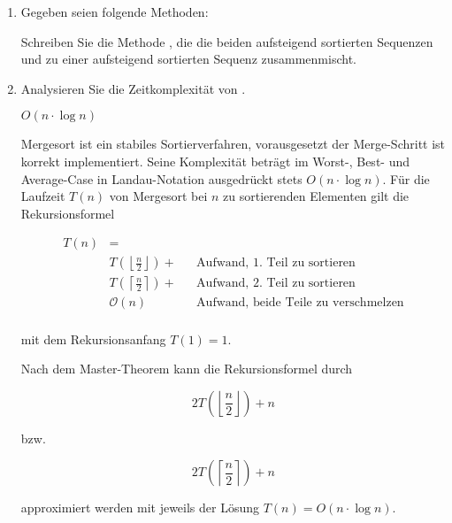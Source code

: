 \documentclass{lehramt-informatik}
\begin{document}
\begin{enumerate}


\item Gegeben seien folgende Methoden:


Schreiben Sie die Methode ,
die die beiden aufsteigend sortierten Sequenzen  und  zu
einer aufsteigend sortierten Sequenz zusammenmischt.

\begin{antwort}
\end{antwort}


\item Analysieren Sie die Zeitkomplexität von .

\begin{antwort}
$O(n \cdot \log n)$


Mergesort ist ein stabiles Sortierverfahren, vorausgesetzt der
Merge-Schritt ist korrekt implementiert. Seine Komplexität beträgt im
Worst-, Best- und Average-Case in Landau-Notation ausgedrückt stets $O(n
\cdot \log n)$. Für die Laufzeit $T(n)$ von Mergesort bei $n$ zu
sortierenden Elementen gilt die Rekursionsformel

\begin{align*}
T(n) & = \\
     & T\left(\left\lfloor\frac{n}{2}\right\rfloor\right) + && \text{Aufwand, 1. Teil zu sortieren}\\
     & T\left(\left\lceil\frac{n}{2}\right\rceil\right) + && \text{Aufwand, 2. Teil zu sortieren}\\
     & \mathcal{O}(n) && \text{Aufwand, beide Teile zu verschmelzen}\\
\end{align*}

mit dem Rekursionsanfang $T(1) = 1$.

Nach dem Master-Theorem kann die Rekursionsformel durch

\begin{displaymath}
2T\left(\left\lfloor\frac{n}{2}\right\rfloor\right) + n
\end{displaymath}

bzw.

\begin{displaymath}
2T\left(\left\lceil\frac{n}{2}\right\rceil\right) + n
\end{displaymath}

approximiert werden mit jeweils der Lösung $T(n) = O(n \cdot \log n)$.
\end{antwort}

\end{enumerate}
\end{document}
